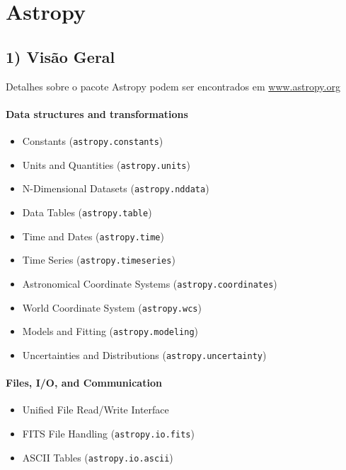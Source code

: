 \documentclass[
  letterpaper,
  DIV=11,
  numbers=noendperiod]{scrreprt}
\providecommand{\tightlist}{%
  \setlength{\itemsep}{0pt}\setlength{\parskip}{0pt}}
\begin{document}
\chapter{Astropy}\label{astropy}

\section{1) Visão Geral}\label{visuxe3o-geral}

Detalhes sobre o pacote Astropy podem ser encontrados em
\href{https://www.astropy.org/}{www.astropy.org}

\subsubsection{Data structures and
transformations}\label{data-structures-and-transformations}

\begin{itemize}
\tightlist
\item
  Constants (\texttt{astropy.constants})
\item
  Units and Quantities (\texttt{astropy.units})
\item
  N-Dimensional Datasets (\texttt{astropy.nddata})
\item
  Data Tables (\texttt{astropy.table})
\item
  Time and Dates (\texttt{astropy.time})
\item
  Time Series (\texttt{astropy.timeseries})
\item
  Astronomical Coordinate Systems (\texttt{astropy.coordinates})
\item
  World Coordinate System (\texttt{astropy.wcs})
\item
  Models and Fitting (\texttt{astropy.modeling})
\item
  Uncertainties and Distributions (\texttt{astropy.uncertainty})
\end{itemize}

\subsubsection{Files, I/O, and
Communication}\label{files-io-and-communication}

\begin{itemize}
\tightlist
\item
  Unified File Read/Write Interface
\item
  FITS File Handling (\texttt{astropy.io.fits})
\item
  ASCII Tables (\texttt{astropy.io.ascii})
\end{itemize}
\end{document}
